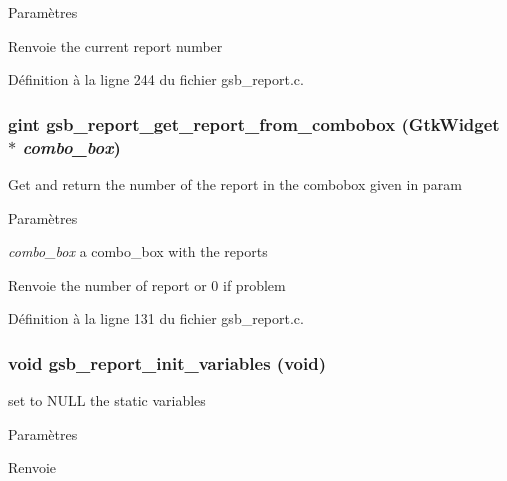 \begin{DoxyParams}{Paramètres}
\item[{\em }]\end{DoxyParams}
\begin{DoxyReturn}{Renvoie}
the current report number 
\end{DoxyReturn}


Définition à la ligne 244 du fichier gsb\_\-report.c.

\subsubsection[{gsb\_\-report\_\-get\_\-report\_\-from\_\-combobox}]{\setlength{\rightskip}{0pt plus 5cm}gint gsb\_\-report\_\-get\_\-report\_\-from\_\-combobox (GtkWidget $\ast$ {\em combo\_\-box})}\label{gsb__report_8c_a856eaa582659de20a636421f85de8b00}
Get and return the number of the report in the combobox given in param


\begin{DoxyParams}{Paramètres}
\item[{\em combo\_\-box}]a combo\_\-box with the reports\end{DoxyParams}
\begin{DoxyReturn}{Renvoie}
the number of report or 0 if problem 
\end{DoxyReturn}


Définition à la ligne 131 du fichier gsb\_\-report.c.

\subsubsection[{gsb\_\-report\_\-init\_\-variables}]{\setlength{\rightskip}{0pt plus 5cm}void gsb\_\-report\_\-init\_\-variables (void)}\label{gsb__report_8c_a9e201d1b7152dc2bc111194ec7ad2e61}
set to NULL the static variables


\begin{DoxyParams}{Paramètres}
\item[{\em }]\end{DoxyParams}
\begin{DoxyReturn}{Renvoie}

\end{DoxyReturn}


